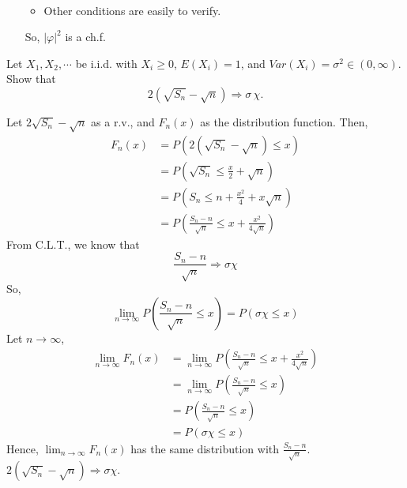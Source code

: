 \documentclass[11pt]{article}
\numberwithin{equation}{section}
\newcounter{exercise}[section]
\newenvironment{exercise}[1][\textsc{Exercise }\thesection.\refstepcounter{exercise}\theexercise]{\begin{tcolorbox}[colback=black!15, colframe=black!80, breakable, title=\textsc{Exercise }#1]}{\end{tcolorbox}}
\newenvironment{solution}{\begin{tcolorbox}[colback=white, colframe=black!50, breakable, title=Solution. ]\setlength{\parskip}{0.8em}}{\end{tcolorbox}}
\begin{document}
\begin{solution}
\begin{enumerate}
\begin{itemize}
\[\begin{aligned}
                        \end{aligned}
                \]
                \item Other conditions are easily to verify. 
            \end{itemize}
            So, $|\varphi|^2$ is a ch.f. 
        \end{enumerate}
    \end{solution}

    \begin{exercise}[3.4.4]
        Let $X_1, X_2, \cdots$ be i.i.d. with $X_i \geqslant 0$, $E(X_i) = 1$, and $Var(X_i)= \sigma^2\in(0,\infty)$. Show that 
        \[
            2\left(\sqrt{S_n}-\sqrt{n}\right)\Rightarrow\sigma\,\chi. 
        \]
    \end{exercise}

    \begin{solution}
        Let $2\sqrt{S_n}-\sqrt{n}$ as a r.v., and $F_n(x)$ as the distribution function. Then, 
        \[
            \begin{aligned}
                F_{n}(x) &=P\left(2\left(\sqrt{S_{n}}-\sqrt{n}\right) \leqslant x\right) \\
                &=P\left(\sqrt{S_{n}} \leqslant \frac{x}{2}+\sqrt{n}\right) \\
                &=P\left(S_{n} \leqslant n+\frac{x^{2}}{4}+x \sqrt{n}\right) \\
                &=P\left(\frac{S_{n}-n}{\sqrt{n}} \leqslant x+\frac{x^{2}}{4 \sqrt{n}}\right)
            \end{aligned}
        \]
        From C.L.T., we know that 
        \[
            \frac{S_{n}-n}{\sqrt{n}} \Rightarrow \sigma \chi
        \]
        So, 
        \[
            \lim _{n \rightarrow \infty} P\left(\frac{S_{n}-n}{\sqrt{n}} \leqslant x\right)=P(\sigma \chi \leqslant x)
        \]
        Let $n\to\infty$, 
        \[
            \begin{aligned}
            \lim _{n \rightarrow \infty} F_{n}(x) &=\lim _{n \rightarrow \infty} P\left(\frac{S_{n}-n}{\sqrt{n}} \leqslant x+\frac{x^{2}}{4 \sqrt{n}}\right) \\
            &=\lim _{n \rightarrow \infty} P\left(\frac{S_{n}-n}{\sqrt{n}} \leqslant x\right) \\
            &=P\left(\frac{S_{n}-n}{\sqrt{n}} \leqslant x\right) \\
            &=P(\sigma \chi \leqslant x)
            \end{aligned}
        \]
        Hence, $\lim_{n\to\infty}F_n(x)$ has the same distribution with $\frac{S_n-n}{\sqrt{n}}$. $2\left(\sqrt{S_{n}}-\sqrt{n}\right) \Rightarrow \sigma \chi$.
    \end{solution}
\end{document}
